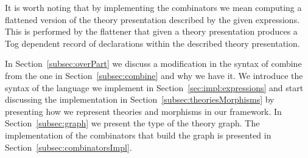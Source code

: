It is worth noting that by implementing the combinators we mean computing a flattened version of the theory presentation described by the given expressions. This is performed by the flattener that given a theory presentation produces a Tog dependent record of declarations within the described theory presentation. 

In Section~\ref{subsec:overPart} we discuss a modification in the syntax of combine from the one in Section~\ref{subsec:combine} and why we have it. We introduce the syntax of the language we implement in Section~\ref{sec:impl:expressions} and start discussing the implementation in Section~\ref{subsec:theoriesMorphisms} by presenting how we represent theories and morphisms in our framework. In Section~\ref{subsec:graph} we present the type of the theory graph. The implementation of the combinators that build the graph is presented in Section~\ref{subsec:combinatorsImpl}. 

